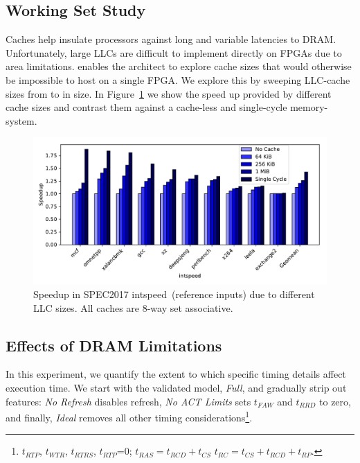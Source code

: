 \subsection{Working Set Study}
Caches help insulate processors against long and variable latencies to DRAM.
Unfortunately, large LLCs are difficult to implement directly on FPGAs due to
area limitations. \PNAME enables the architect to explore cache sizes that
would otherwise be impossible to host on a single FPGA. We explore this by
sweeping LLC-cache sizes from  to  in size. In
Figure~\ref{fig:llc-speedup} we show the speed up provided by different cache
sizes and contrast them against a cache-less and single-cycle memory-system.

\begin{figure}[t]
    \centering
    \includegraphics[width=\columnwidth]{figures/cache_size_bar_plot.pdf}
    \caption{Speedup in SPEC2017 intspeed~(reference inputs) due to different LLC sizes. All caches are 8-way set associative.}
    \label{fig:llc-speedup}
\vspace{-0.15in}
\end{figure}

\subsection{Effects of DRAM Limitations}

In this experiment, we quantify the extent to which specific timing details
affect execution time. We start with the validated model, \emph{Full}, and
gradually strip out features: \emph{No Refresh} disables refresh, \emph{No ACT
Limits} sets $t_{FAW}$ and $t_{RRD}$ to zero, and finally, \emph{Ideal} removes
all other timing considerations\footnote{$t_{RTP}$, $t_{WTR}$,
$t_{RTRS}$, $t_{RTP}$=0; $t_{RAS} = t_{RCD} + t_{CS}$ $t_{RC} =
t_{CS} + t_{RCD} + t_{RP}$.}.

